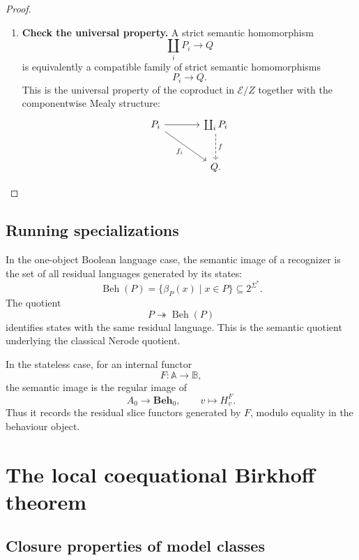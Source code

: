 \begin{proof}
\begin{enumerate}
        \item \textbf{Check the universal property.}
        A strict semantic homomorphism
        \[
            \coprod_iP_i\to Q
        \]
        is equivalently a compatible family of strict semantic homomorphisms
        \[
            P_i\to Q.
        \]
        This is the universal property of the coproduct in \(\mathcal E/Z\)
        together with the componentwise Mealy structure:
        \[
        \begin{tikzcd}[column sep=large, row sep=large]
            P_i
                \arrow[r]
                \arrow[dr, "f_i"']
            &
            \coprod_iP_i
                \arrow[d, dashed, "f"]
            \\
            &
            Q .
        \end{tikzcd}
        \]
    \end{enumerate}
\end{proof}

\subsection{Running specializations}
\label{subsec:semantic-images-running-specializations}

In the one-object Boolean language case, the semantic image of a recognizer is
the set of all residual languages generated by its states:
\[
    \operatorname{Beh}(P)
    =
    \{\beta_P(x)\mid x\in P\}
    \subseteq
    2^{\Sigma^*}.
\]
The quotient
\[
    P\twoheadrightarrow\operatorname{Beh}(P)
\]
identifies states with the same residual language. This is the semantic
quotient underlying the classical Nerode quotient.

In the stateless case, for an internal functor
\[
    F:\mathbb A\to\mathbb B,
\]
the semantic image is the regular image of
\[
    A_0\to\mathbf{Beh}_0,
    \qquad
    v\longmapsto H^F_v.
\]
Thus it records the residual slice functors generated by \(F\), modulo equality
in the behaviour object.

\section{The local coequational Birkhoff theorem}
\label{sec:local-coequational-birkhoff}

\subsection{Closure properties of model classes}
\label{subsec:closure-properties-model-classes}

